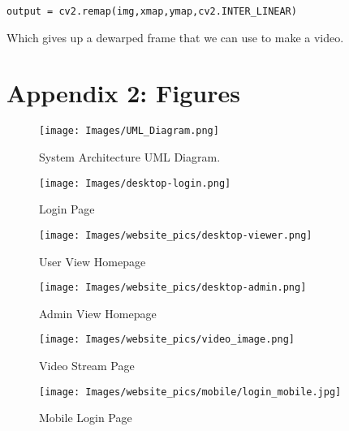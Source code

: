 \documentclass[onecolumn, draftclsnofoot,10pt, compsoc]{IEEEtran}
\begin{document}
\begin{lstlisting}
output = cv2.remap(img,xmap,ymap,cv2.INTER_LINEAR)
\end{lstlisting}
Which gives up a dewarped frame that we can use to make a video.


\section{Appendix 2: Figures}

    \begin{figure}[!hb]
        \centering
        \texttt{[image: Images/UML\_Diagram.png]}
        \centering\caption{System Architecture UML Diagram.}
        \label{fig:Architecture}
    \end{figure}


 \begin{figure}[h!]
            \centering
            \texttt{[image: Images/desktop-login.png]}
            \centering\caption{Login Page}
            \label{fig:Login}
        \end{figure}
        
        \begin{figure}[h!]
            \centering
            \texttt{[image: Images/website\_pics/desktop-viewer.png]}
            \centering\caption{User View Homepage}
            \label{fig:User}
        \end{figure}
        \begin{figure}[h!]
            \centering
            \texttt{[image: Images/website\_pics/desktop-admin.png]}
            \centering\caption{Admin View Homepage}
            \label{fig:Admin}
        \end{figure}
        
        \begin{figure}[h!]
            \centering
            \texttt{[image: Images/website\_pics/video\_image.png]}
            \centering\caption{Video Stream Page}
            \label{fig:Video}
        \end{figure}



   
    \begin{figure}[h!]
        \centering
        \texttt{[image: Images/website\_pics/mobile/login\_mobile.jpg]}
        \centering\caption{Mobile Login Page}
        \label{fig:MLogin}
    \end{figure}
    
\end{document}
